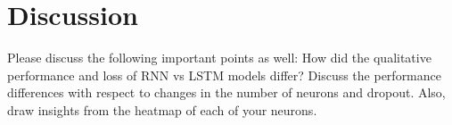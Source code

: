 \section*{Discussion}
Please discuss the following important points as well: How did the qualitative performance and loss of RNN vs LSTM models differ? Discuss the performance differences with respect to changes in the number of neurons and dropout. Also, draw insights from the heatmap of each of your neurons.

